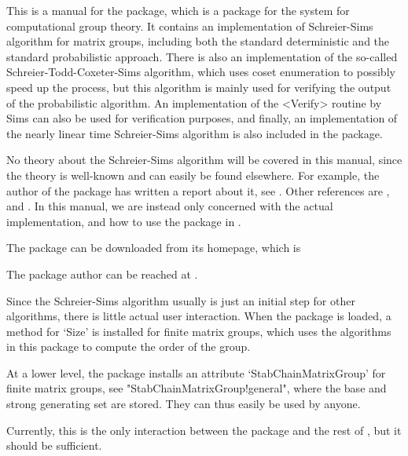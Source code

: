 

This is a manual for the {\matrixss} package, which is a package for
the {\GAP} system for computational group theory. It contains an
implementation of Schreier-Sims algorithm for matrix groups, including
both the standard deterministic and the standard probabilistic
approach. There is also an implementation of the so-called
Schreier-Todd-Coxeter-Sims algorithm, which uses coset enumeration to
possibly speed up the process, but this algorithm is mainly used for
verifying the output of the probabilistic algorithm. An implementation
of the <Verify> routine by Sims can also be used for verification
purposes, and finally, an implementation of the nearly linear time
Schreier-Sims algorithm is also included in the package.

No theory about the Schreier-Sims algorithm will be covered in this
manual, since the theory is well-known and can easily be found elsewhere. For
example, the author of the package has written a report about it, see
\cite{baarnhielm04}. Other references are \cite{butler91},
\cite{soicher98} and \cite{seress03}. In this manual, we are instead only
concerned with the actual implementation, and how to use the package
in {\GAP}.

The package can be downloaded from its homepage, which is 

The package author can be reached at .


Since the Schreier-Sims algorithm usually is just an initial step for
other algorithms, there is little actual user interaction. When the package is loaded, a method for `Size' is installed for finite matrix groups, which uses the algorithms in this package to compute the order of the group. 

At a lower level, the package installs an attribute `StabChainMatrixGroup'  for finite matrix groups, see "StabChainMatrixGroup!general", where the base and strong generating set are stored. They can thus easily be used by anyone.

Currently, this is the only interaction between the package and the rest of {\GAP}, but it should be sufficient.

